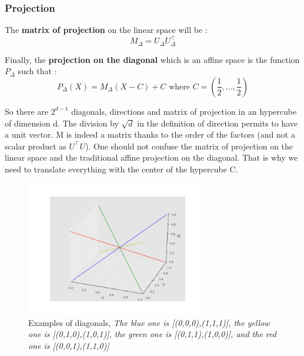 \documentclass{article}
\begin{document}
	
   \subsubsection{Projection}
	
	
	\begin{definition}
	The \textbf{matrix of projection} on the linear space will be :
	\begin{equation*}
		M_\Delta = U_\Delta U_\Delta^\top
	\end{equation*}
	
	Finally, the \textbf{projection on the diagonal} which is an affine space is the function \begin{math} P_\Delta \end{math} such that :
	\begin{equation}
		P_\Delta(X) = M_\Delta(X-C)+C \text{ where } C=(\frac{1}{2},...,\frac{1}{2})
	\end{equation}
	
	
	\end{definition}
	
	
	So there are \begin{math} 2^{d-1}\end{math} diagonals, directions and matrix of projection in an hypercube of dimension d.\newline
	\newline
	The division by \begin{math} \sqrt{d} \end{math} in the definition of direction permits to have a unit vector.\newline
	\newline
	M is indeed a matrix thanks to the order of the factors (and not a scalar product as \begin{math} U^\top U \end{math}).\newline
	\newline
	One should not confuse the matrix of projection on the linear space and the traditional affine projection on the diagonal. That is why we need to translate everything with the center of the hypercube C.
	\newline
	\begin{figure}
  
    \includegraphics[width=0.7\textwidth]{Diagonals3d.png}
    \centering
    \caption{Examples of diagonals, \emph{The blue one is [(0,0,0),(1,1,1)], the yellow one is [(0,1,0),(1,0,1)], the green one is [(0,1,1),(1,0,0)],  and the red one is [(0,0,1),(1,1,0)] }}
\end{figure}
\end{document}
